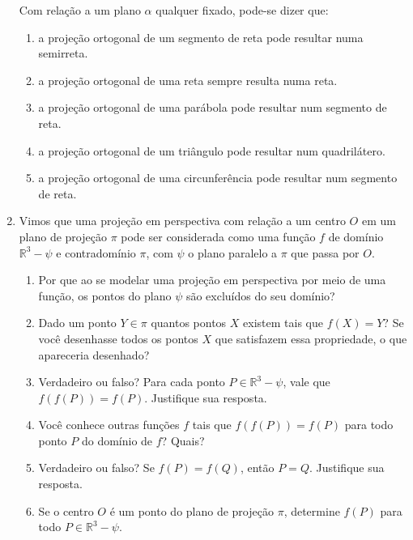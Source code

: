 \begin{enumerate}
Com relação a um plano \(\alpha\) qualquer fixado, pode-se dizer que:

\begin{enumerate}
\item a projeção ortogonal de um segmento de reta pode resultar numa semirreta.

\item a projeção ortogonal de uma reta sempre resulta numa reta.

\item a projeção ortogonal de uma parábola pode resultar num segmento de reta.

\item a projeção ortogonal de um triângulo pode resultar num quadrilátero.

\item a projeção ortogonal de uma circunferência pode resultar num segmento de reta.
\end{enumerate}

\item Vimos que uma projeção em perspectiva com relação a um centro \(O\) em um plano de projeção \(\pi\) pode ser considerada como uma função \(f\) de domínio \({\mathbb R}^{3} - \psi\) e contradomínio \(\pi\), com \(\psi\) o plano paralelo a \(\pi\) que passa por \(O\).
\begin{enumerate}
\item {} 
Por que ao se modelar uma projeção em perspectiva por meio de uma função, os pontos do plano \(\psi\) são excluídos do seu domínio?

\item {} 
Dado um ponto \(Y \in \pi\) quantos pontos \(X\) existem tais que \(f(X) = Y\)? Se você desenhasse todos os pontos \(X\) que satisfazem essa propriedade, o que apareceria desenhado?

\item {} 
Verdadeiro ou falso? Para cada ponto \(P \in {\mathbb R}^{3} - \psi\), vale que \(f(f(P)) = f(P)\). Justifique sua resposta.

\item {} 
Você conhece outras funções \(f\) tais que \(f(f(P)) = f(P)\) para todo ponto \(P\) do domínio de \(f\)? Quais?

\item {} 
Verdadeiro ou falso? Se \(f(P) = f(Q)\), então \(P = Q\). Justifique sua resposta.

\item {} 
Se o centro \(O\) é um ponto do plano de projeção \(\pi\), determine \(f(P)\) para todo \(P \in {\mathbb R}^{3} - \psi\).


\end{enumerate}
\end{enumerate}
